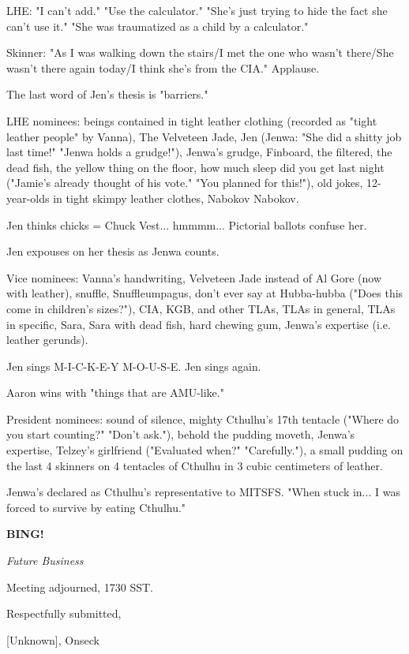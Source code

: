 \documentclass[12pt]{article}
\newcommand{\bing}{{\bf BING!} }
\newcommand{\goto}[1]{\bing \vskip 12pt \centerline{{\em{#1}}}}
\begin{document}
LHE: "I can't add." "Use the calculator." "She's just trying to hide the fact she can't use it." "She was traumatized as a child by a calculator."

Skinner: "As I was walking down the stairs/I met the one who wasn't there/She wasn't there again today/I think she's from the CIA." Applause.

The last word of Jen's thesis is "barriers."

LHE nominees: beings contained in tight leather clothing (recorded as "tight leather people" by Vanna), The Velveteen Jade, Jen (Jenwa: "She did a shitty job last time!" "Jenwa holds a grudge!"), Jenwa's grudge, Finboard, the filtered, the dead fish, the yellow thing on the floor, how much sleep did you get last night ("Jamie's already thought of his vote." "You planned for this!"), old jokes, 12-year-olds in tight skimpy leather clothes, Nabokov Nabokov.

Jen thinks chicks = Chuck Vest... hmmmm... Pictorial ballots confuse her.

Jen expouses on her thesis as Jenwa counts.

Vice nominees: Vanna's handwriting, Velveteen Jade instead of Al Gore (now with leather), snuffle, Snuffleumpagus, don't ever say at Hubba-hubba ("Does this come in children's sizes?"), CIA, KGB, and other TLAs, TLAs in general, TLAs in specific, Sara, Sara with dead fish, hard chewing gum, Jenwa's expertise (i.e. leather gerunds).

Jen sings M-I-C-K-E-Y M-O-U-S-E. Jen sings again.

Aaron wins with "things that are AMU-like."

President nominees: sound of silence, mighty Cthulhu's 17th tentacle ("Where do you start counting?" "Don't ask."), behold the pudding moveth, Jenwa's expertise, Telzey's girlfriend ("Evaluated when?" "Carefully."), a small pudding on the last 4 skinners on 4 tentacles of Cthulhu in 3 cubic centimeters of leather.

Jenwa's declared as Cthulhu's representative to MITSFS. "When stuck in... I was forced to survive by eating Cthulhu."

\goto{Future Business}

\vspace{12pt}

\noindent
Meeting adjourned, 1730 SST.

\vspace{18pt}

\centerline{Respectfully submitted,}
\centerline{[Unknown], Onseck}
\end{document}
